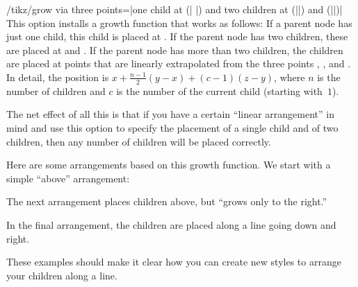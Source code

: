 \begin{key}{/tikz/grow via three points=|one child at (|%
  |) and two children at (||) and (||)|}
  This option installs a growth function that works as follows: If a
  parent node has just one child, this child is placed at . If
  the parent node has two children, these are placed at  and
  . If the parent node has more than two children, the
  children are placed at points that are linearly extrapolated from
  the three points , , and . In detail, the
  position is $x + \frac{n-1}{2}(y-x) + (c-1)(z-y)$, where $n$ is the
  number of children and $c$ is the number of the current child
  (starting with~$1$).

  The net effect of all this is that if you have a certain ``linear
  arrangement'' in mind and use this option to specify the placement
  of a single child and of two children, then any number of children
  will be placed correctly.

  Here are some arrangements based on this growth function. We start
  with a simple ``above'' arrangement:
\begin{codeexample}[]
\end{codeexample}    

  The next arrangement places children above, but ``grows only to the
  right.'' 
\begin{codeexample}[]
\end{codeexample}    

  In the final arrangement, the children are placed along a line going
  down and right.
\begin{codeexample}[]
\end{codeexample}

  These examples should make it clear how you can create new styles to
  arrange your children along a line.
\end{key}


